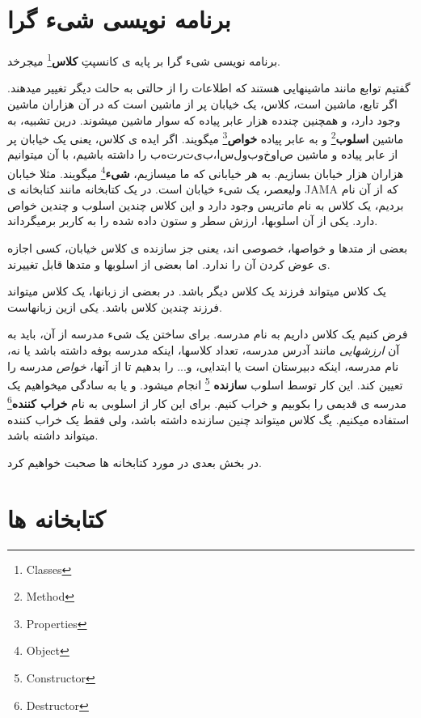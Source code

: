\documentclass[14pt,a4paper]{memoir}
\begin{document}
	
	
	
	
	
	 
	 \section{برنامه نویسی شیء گرا}\label{oop}
	 
	 
	 برنامه نویسی شیء گرا بر پایه ی کانسپتِ \textbf{کلاس}\footnote{Classes} میجرخد.
	 
	 گفتیم توابع مانند ماشینهایی هستند که اطلاعات را از حالتی به حالت دیگر تغییر میدهند. اگر تابع، ماشین است، کلاس، یک خیابان پر از ماشین است که در آن هزاران ماشین وجود دارد، و همچنین چندده هزار عابر پیاده که سوار ماشین میشوند. درین تشبیه، به ماشین \textbf{اسلوب}\footnote{Method} و به عابر پیاده \textbf{خواص}\footnote{Properties} میگویند. اگر ایده ی کلاس، یعنی یک خیابان پر از عابر پیاده و ماشین \(به ترتیب، اسلوب و خواص\) را داشته باشیم، با آن میتوانیم هزاران هزار خیابان بسازیم. به هر خیابانی که ما میسازیم، \textbf{شیء}\footnote{Object} میگویند. مثلا خیابان ولیعصر، یک شیء خیابان است. در یک کتابخانه مانند کتابخانه ی JAMA که از آن نام بردیم، یک کلاس به نام ماتریس وجود دارد و این کلاس چندین اسلوب و چندین خواص دارد. یکی از آن اسلوبها، ارزش سطر و ستون داده شده را به کاربر برمیگرداند.
	 
	 بعضی از متدها و خواصها، خصوصی اند، یعنی جز سازنده ی کلاس خیابان، کسی اجازه ی عوض کردن آن را ندارد. اما بعضی از اسلوبها و متدها قابل تغییرند.
	 
	 یک کلاس میتواند فرزند یک کلاس دیگر باشد. در بعضی از زبانها، یک کلاس میتواند فرزند چندین کلاس باشد.  یکی ازین زبانهاست.
	 
	 فرض کنیم یک کلاس داریم به نام مدرسه. برای ساختن یک شیء مدرسه از آن، باید به آن \textit{ارزشهایی} مانند آدرس مدرسه، تعداد کلاسها، اینکه مدرسه بوفه داشته باشد یا نه، نام مدرسه، اینکه دبیرستان است یا ابتدایی، و... را بدهیم تا از آنها، \textit{خواص} مدرسه را تعیین کند. این کار توسط اسلوب \textbf{سازنده} \footnote{Constructor} انجام میشود. و یا به سادگی میخواهیم یک مدرسه ی قدیمی را بکوبیم و خراب کنیم. برای این کار از اسلوبی به نام \textbf{خراب کننده}\footnote{Destructor} استفاده میکنیم. 
	 یگ کلاس میتواند چنین سازنده داشته باشد، ولی فقط یک خراب کننده میتواند داشته باشد.
	 
	 در بخش بعدی در مورد کتابخانه ها صحبت خواهیم کرد.
	 
	 \section{کتابخانه ها}\label{lib}
	 
\end{document}
